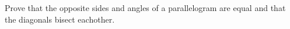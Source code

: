 Prove that the opposite sides and angles of a parallelogram are equal and that the diagonals bisect
eachother.\\

\begin{solution}\renewcommand{\qedsymbol}{}\ \\

    

\end{solution}